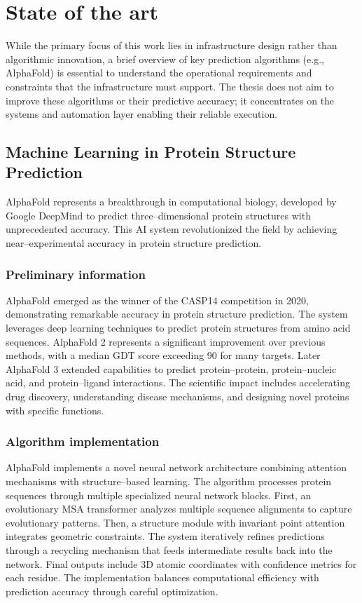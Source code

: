 

\chapter{State of the art}

While the primary focus of this work lies in infrastructure design rather than algorithmic innovation, a brief overview of key prediction algorithms (e.g., AlphaFold) is essential to understand the operational requirements and constraints that the infrastructure must support. The thesis does not aim to improve these algorithms or their predictive accuracy; it concentrates on the systems and automation layer enabling their reliable execution.


\section{Machine Learning in Protein Structure Prediction}

AlphaFold represents a breakthrough in computational biology, developed by Google DeepMind to predict three--dimensional protein structures with unprecedented accuracy.
This AI system revolutionized the field by achieving near--experimental accuracy in protein structure prediction.

\subsection{Preliminary information}

AlphaFold emerged as the winner of the CASP14 competition in 2020, demonstrating remarkable accuracy in protein structure prediction.
The system leverages deep learning techniques to predict protein structures from amino acid sequences.
AlphaFold 2 represents a significant improvement over previous methods, with a median GDT score exceeding 90 for many targets.
Later AlphaFold 3 extended capabilities to predict protein--protein, protein--nucleic acid, and protein--ligand interactions.
The scientific impact includes accelerating drug discovery, understanding disease mechanisms, and designing novel proteins with specific functions.

\subsection{Algorithm implementation}

AlphaFold implements a novel neural network architecture combining attention mechanisms with structure--based learning.
The algorithm processes protein sequences through multiple specialized neural network blocks.
First, an evolutionary MSA transformer analyzes multiple sequence alignments to capture evolutionary patterns.
Then, a structure module with invariant point attention integrates geometric constraints.
The system iteratively refines predictions through a recycling mechanism that feeds intermediate results back into the network.
Final outputs include 3D atomic coordinates with confidence metrics for each residue.
The implementation balances computational efficiency with prediction accuracy through careful optimization.

